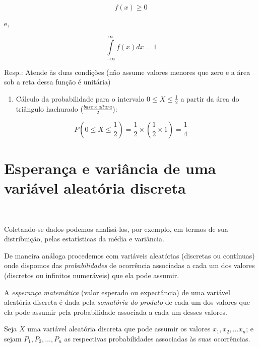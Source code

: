 \documentclass[
]{book}
\providecommand{\tightlist}{%
  \setlength{\itemsep}{0pt}\setlength{\parskip}{0pt}}
\begin{document}
\hfill\break

\[
f(x) \geq 0
\]

e,

\[\underset{-\infty }{\overset{\infty }{\int }}f\left(x\right)dx = 1
\]

\hfill\break

Resp.: Atende às duas condições (não assume valores menores que zero e a área sob a reta dessa função é unitária)

\hfill\break

\begin{enumerate}
\def\labelenumi{(\alph{enumi})}
\setcounter{enumi}{1}
\tightlist
\item
  Cálculo da probabilidade para o intervalo \(0 \leq X \leq \frac{1}{2}\) a partir da área do triângulo hachurado (\(\frac{base \times altura}{2}\)):
\end{enumerate}

\hfill\break

\[
P ( 0 \leq X \leq \frac{1}{2}) = \frac{1}{2} \times (\frac{1}{2} \times 1 ) = \frac{1}{4} 
\]

\hypertarget{esperanuxe7a-e-variuxe2ncia-de-uma-variuxe1vel-aleatuxf3ria-discreta}{%
\section{Esperança e variância de uma variável aleatória discreta}\label{esperanuxe7a-e-variuxe2ncia-de-uma-variuxe1vel-aleatuxf3ria-discreta}}

~

Coletando-se dados podemos analisá-los, por exemplo, em termos de sua distribuição, pelas estatísticas da média e variância.

De maneira análoga procedemos com variáveis aleatórias (discretas ou contínuas) onde dispomos das \emph{probabilidades} de ocorrência associadas a cada um dos valores (discretos ou infinitos numeráveis) que ela pode assumir.

\hfill\break

A \emph{esperança matemática} (valor esperado ou expectância) de uma variável aleatória discreta é dada pela \emph{somatória do produto} de cada um dos valores que ela pode assumir pela probabilidade associada a cada um desses valores.

\hfill\break

Seja \(X\) uma variável aleatória discreta que pode assumir os valores \(x_{1},x_{2}, \dots x_{n}\); e sejam \(P_{1},P_{2}, \dots, P_{n}\) as respectivas probabilidades associadas às suas ocorrências.
\end{document}
